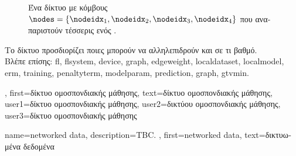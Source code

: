 {{\begin{figure}[H]
		\centering
		{
		\caption{\foreignlanguage{greek}{Ένα δίκτυο}  \foreignlanguage{greek}{με κόμβους 
			$\nodes=\{\nodeidx_1,\nodeidx_2,\nodeidx_3,\nodeidx_4\}$ που αναπαριστούν τέσσερις}  
			\foreignlanguage{greek}{ενός} . \label{fig_fl_network_dict}} }
		\end{figure}
		\foreignlanguage{greek}{Το δίκτυο}  \foreignlanguage{greek}{προσδιορίζει ποιες}  
		\foreignlanguage{greek}{μπορούν να αλληλεπιδρούν και σε τι βαθμό.} 
		\\
	    	\foreignlanguage{greek}{Βλέπε επίσης:} \gls{fl}, \gls{flsystem}, \gls{device}, \gls{graph}, \gls{edgeweight}, \gls{localdataset}, 
		\gls{localmodel}, \gls{erm}, \gls{training}, \gls{penaltyterm}, \gls{modelparam}, \gls{prediction}, \gls{graph}, \gls{gtvmin}. },
	  first={\foreignlanguage{greek}{δίκτυο ομοσπονδιακής μάθησης}},
	  text={\foreignlanguage{greek}{δίκτυο ομοσπονδιακής μάθησης}},
	  user1={\foreignlanguage{greek}{δίκτυο ομοσπονδιακής μάθησης}}, %
  	  user2={\foreignlanguage{greek}{δικτύου ομοσπονδιακής μάθησης}}, %
	  user3={\foreignlanguage{greek}{δίκτυο ομοσπονδιακής μάθησης}} %
}

{name={networked data},
	description={TBC. }, 
	first={networked data},
	text={\foreignlanguage{greek}{δικτυωμένα δεδομένα}}  
}%

